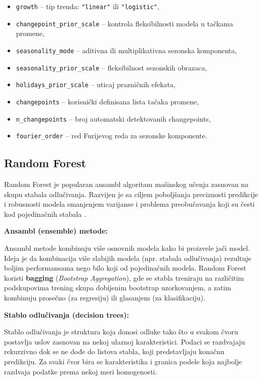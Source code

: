 \documentclass[12pt]{article}
\begin{document}
\begin{itemize}
    \item \texttt{growth} -- tip trenda: \texttt{"linear"} ili \texttt{"logistic"},
    \item \texttt{changepoint\_prior\_scale} -- kontrola fleksibilnosti modela u tačkama promene,
    \item \texttt{seasonality\_mode} -- aditivna ili multiplikativna sezonska komponenta,
    \item \texttt{seasonality\_prior\_scale} -- fleksibilnost sezonskih obrazaca,
    \item \texttt{holidays\_prior\_scale} -- uticaj prazničnih efekata,
    \item \texttt{changepoints} -- korisnički definisana lista tačaka promene,
    \item \texttt{n\_changepoints} -- broj automatski detektovanih changepoints,
    \item \texttt{fourier\_order} -- red Furijevog reda za sezonske komponente.
\end{itemize}



\subsection{Random Forest}

Random Forest je popularan ansambl algoritam mašinskog učenja zasnovan na skupu stabala odlučivanja. Razvijen je sa ciljem poboljšanja preciznosti predikcije i robusnosti modela smanjenjem varijanse i problema preobučavanja koji su česti kod pojedinačnih stabala \cite{breiman2001}.

\textbf{Ansambl (ensemble) metode:}

Ansambl metode kombinuju više osnovnih modela kako bi proizvele jači model. Ideja je da kombinacija više slabijih modela (npr. stabala odlučivanja) rezultuje boljim performansama nego bilo koji od pojedinačnih modela. Random Forest koristi \textbf{bagging} (\textit{Bootstrap Aggregation}), gde se stabla treniraju na različitim podskupovima trening skupa dobijenim bootstrap uzorkovanjem, a zatim kombinuju prosečno (za regresiju) ili glasanjem (za klasifikaciju).

\textbf{Stablo odlučivanja (decision trees):}

Stablo odlučivanja je struktura koja donosi odluke tako što u svakom čvoru postavlja uslov zasnovan na nekoj ulaznoj karakteristici. Podaci se razdvajaju rekurzivno dok se ne dođe do listova stabla, koji predstavljaju konačnu predikciju. Za svaki čvor bira se karakteristika i granica podele koja najbolje razdvaja podatke prema nekoj meri homogenosti.
\end{document}
